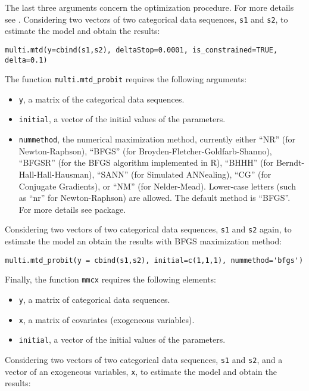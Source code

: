 The last three arguments concern the optimization procedure. For more details see \citet{Berchtold2001}. Considering two vectors of two categorical data sequences, \texttt{s1} and \texttt{s2}, to estimate the model and obtain the results:

\begin{verbatim}
multi.mtd(y=cbind(s1,s2), deltaStop=0.0001, is_constrained=TRUE, delta=0.1)
\end{verbatim}

The function \texttt{multi.mtd\_probit} requires the following arguments:

\begin{itemize}
\tightlist
\item
  \texttt{y}, a matrix of the categorical data sequences.
\item
  \texttt{initial}, a vector of the initial values of the parameters.
\item
  \texttt{nummethod}, the numerical maximization method, currently either ``NR'' (for Newton-Raphson), ``BFGS'' (for Broyden-Fletcher-Goldfarb-Shanno), ``BFGSR'' (for the BFGS algorithm implemented in R), ``BHHH'' (for Berndt-Hall-Hall-Hausman), ``SANN'' (for Simulated ANNealing), ``CG'' (for Conjugate Gradients), or ``NM'' (for Nelder-Mead). Lower-case letters (such as ``nr'' for Newton-Raphson) are allowed. The default method is ``BFGS''. For more details see  \citep{maxLik} package.
\end{itemize}

Considering two vectors of two categorical data sequences, \texttt{s1} and \texttt{s2} again, to estimate the model an obtain the results with BFGS maximization method:

\begin{verbatim}
multi.mtd_probit(y = cbind(s1,s2), initial=c(1,1,1), nummethod='bfgs')
\end{verbatim}

Finally, the function \texttt{mmcx} requires the following elements:

\begin{itemize}
\tightlist
\item
  \texttt{y}, a matrix of categorical data sequences.
\item
  \texttt{x}, a matrix of covariates (exogeneous variables).
\item
  \texttt{initial}, a vector of the initial values of the parameters.
\end{itemize}

Considering two vectors of two categorical data sequences, \texttt{s1} and \texttt{s2}, and a vector of an exogeneous variables, \texttt{x}, to estimate the model and obtain the results:

